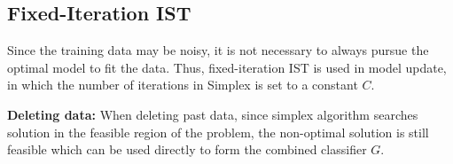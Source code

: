 \documentclass[letterpaper]{article}
\begin{document}
\subsection{Fixed-Iteration IST}



Since the training data may be noisy, it is not necessary to always pursue the optimal model to fit the data. Thus, fixed-iteration IST is used in model update,  in which the number of iterations in Simplex is set to a constant $C$. %

\indent \indent \textbf{Deleting data:} When deleting past data, since simplex algorithm searches solution in the feasible region of the problem, the non-optimal solution is still feasible which can be used directly to form the combined classifier $G$.
\end{document}
